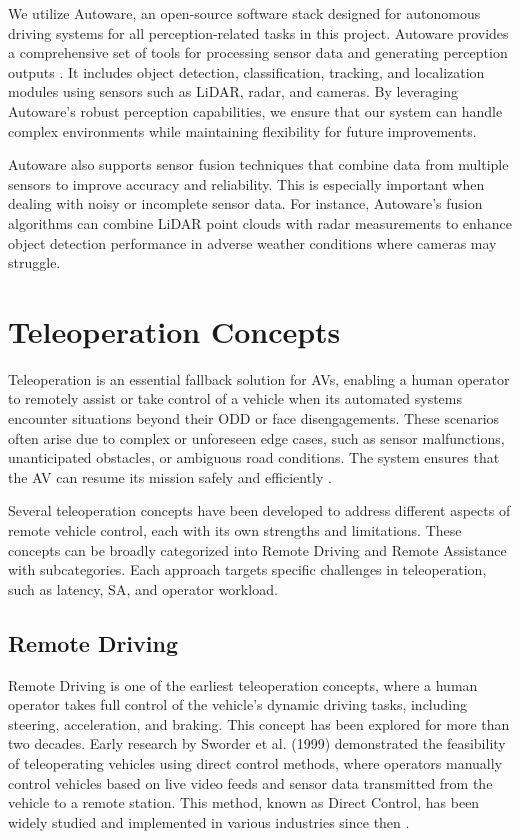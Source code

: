 We utilize Autoware, an open-source software stack designed for autonomous driving systems for all perception-related tasks in this project. Autoware provides a comprehensive set of tools for processing sensor data and generating perception outputs \cite{kato2018autoware}. It includes object detection, classification, tracking, and localization modules using sensors such as \ac{LiDAR}, radar, and cameras. By leveraging Autoware's robust perception capabilities, we ensure that our system can handle complex environments while maintaining flexibility for future improvements.

Autoware also supports sensor fusion techniques that combine data from multiple sensors to improve accuracy and reliability. This is especially important when dealing with noisy or incomplete sensor data. For instance, Autoware's fusion algorithms can combine \ac{LiDAR} point clouds with radar measurements to enhance object detection
performance in adverse weather conditions where cameras may struggle.
\section{Teleoperation Concepts} \label{section:teleoperation}

Teleoperation is an essential fallback solution for \acp{AV},
enabling a human operator to remotely assist or take control of a vehicle when
its automated systems encounter situations beyond their \ac{ODD}
or face disengagements. These scenarios often arise due to complex or unforeseen edge cases,
such as sensor malfunctions, unanticipated obstacles, or ambiguous road conditions.
The system ensures that the \ac{AV} can resume its mission safely and efficiently \cite{Brecht}.

Several teleoperation concepts have been developed to address different aspects of remote vehicle control, each with its own strengths and limitations. These concepts can be broadly categorized into Remote Driving and Remote Assistance with subcategories. Each approach targets specific challenges in teleoperation, such as latency, \ac{SA}, and operator workload.

\subsection{Remote Driving}
Remote Driving is one of the earliest teleoperation concepts,
where a human operator takes full control of the vehicle's
dynamic driving tasks, including steering, acceleration,
and braking. This concept has been explored for more than two decades.
Early research by Sworder et al. \cite{sworder1999performance} (1999) demonstrated the feasibility
of teleoperating vehicles using direct control methods, where
operators manually control vehicles based on live video feeds and
sensor data transmitted from the vehicle to a remote station.
This method, known as Direct Control, has been widely studied
and implemented in various industries since then \cite{Gnatzig,chucholowski2014teleoperated,Tang}.

